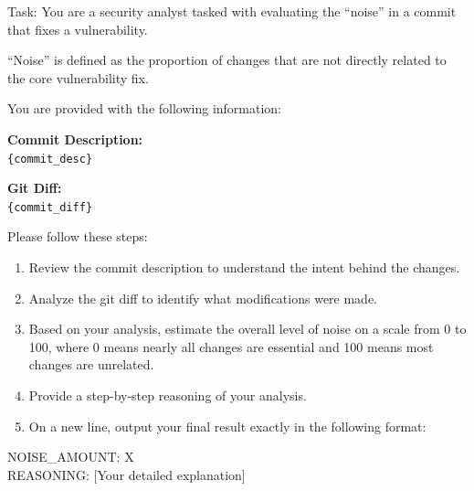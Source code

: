 \documentclass[sigconf]{acmart}
\begin{document}
\begin{tcolorbox}[colback=white, colframe=black, title=Noise Evaluation Prompt]
Task: You are a security analyst tasked with evaluating the ``noise'' in a commit that fixes a vulnerability.

``Noise'' is defined as the proportion of changes that are not directly related to the core vulnerability fix.

You are provided with the following information:

\textbf{Commit Description:} \\
\verb|{commit_desc}|

\textbf{Git Diff:} \\
\verb|{commit_diff}|

Please follow these steps:

\begin{enumerate}
    \item Review the commit description to understand the intent behind the changes.
    \item Analyze the git diff to identify what modifications were made.
    \item Based on your analysis, estimate the overall level of noise on a scale from 0 to 100, where 0 means nearly all changes are essential and 100 means most changes are unrelated.
    \item Provide a step-by-step reasoning of your analysis.
    \item On a new line, output your final result exactly in the following format:
\end{enumerate}

NOISE\_AMOUNT: X \\
REASONING: [Your detailed explanation]
\end{tcolorbox}

\end{document}
